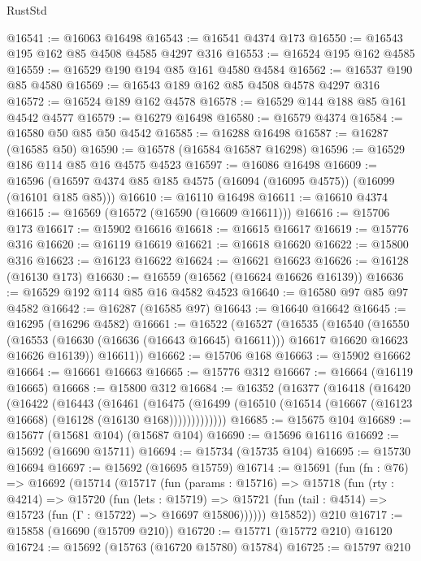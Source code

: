\begin{lexlean}{RustStd}
\begin{coremodule}
@16541 := @16063 @16498
@16543 := @16541 @4374 @173
@16550 := @16543 @195 @162 @85 @4508 @4585 @4297 @316
@16553 := @16524 @195 @162 @4585
@16559 := @16529 @190 @194 @85 @161 @4580 @4584
@16562 := @16537 @190 @85 @4580
@16569 := @16543 @189 @162 @85 @4508 @4578 @4297 @316
@16572 := @16524 @189 @162 @4578
@16578 := @16529 @144 @188 @85 @161 @4542 @4577
@16579 := @16279 @16498
@16580 := @16579 @4374
@16584 := @16580 @50 @85 @50 @4542
@16585 := @16288 @16498
@16587 := @16287 (@16585 @50)
@16590 := @16578 (@16584 @16587 @16298)
@16596 := @16529 @186 @114 @85 @16 @4575 @4523
@16597 := @16086 @16498
@16609 := @16596 (@16597 @4374 @85 @185 @4575 (@16094 (@16095 @4575)) (@16099 (@16101 @185 @85)))
@16610 := @16110 @16498
@16611 := @16610 @4374
@16615 := @16569 (@16572 (@16590 (@16609 @16611)))
@16616 := @15706 @173
@16617 := @15902 @16616
@16618 := @16615 @16617
@16619 := @15776 @316
@16620 := @16119 @16619
@16621 := @16618 @16620
@16622 := @15800 @316
@16623 := @16123 @16622
@16624 := @16621 @16623
@16626 := @16128 (@16130 @173)
@16630 := @16559 (@16562 (@16624 @16626 @16139))
@16636 := @16529 @192 @114 @85 @16 @4582 @4523
@16640 := @16580 @97 @85 @97 @4582
@16642 := @16287 (@16585 @97)
@16643 := @16640 @16642
@16645 := @16295 (@16296 @4582)
@16661 := @16522
    (@16527
      (@16535
        (@16540
          (@16550
            (@16553 (@16630 (@16636 (@16643 @16645) @16611)))
            @16617
            @16620
            @16623
            @16626
            @16139))
        @16611))
@16662 := @15706 @168
@16663 := @15902 @16662
@16664 := @16661 @16663
@16665 := @15776 @312
@16667 := @16664 (@16119 @16665)
@16668 := @15800 @312
@16684 := @16352
    (@16377
      (@16418
        (@16420
          (@16422
            (@16443
              (@16461
                (@16475
                  (@16499 (@16510 (@16514 (@16667 (@16123 @16668) (@16128 (@16130 @168)))))))))))))
@16685 := @15675 @104
@16689 := @15677 (@15681 @104) (@15687 @104)
@16690 := @15696 @16116
@16692 := @15692 (@16690 @15711)
@16694 := @15734 (@15735 @104)
@16695 := @15730 @16694
@16697 := @15692 (@16695 @15759)
@16714 := @15691
    (fun (fn : @76) =>
    @16692
      (@15714
        (@15717
          (fun (params : @15716) =>
          @15718
            (fun (rty : @4214) =>
            @15720
              (fun (lets : @15719) =>
              @15721 (fun (tail : @4514) => @15723 (fun (Γ : @15722) => @16697 @15806))))))
        @15852))
    @210
@16717 := @15858 (@16690 (@15709 @210))
@16720 := @15771 (@15772 @210) @16120
@16724 := @15692 (@15763 (@16720 @15780) @15784)
@16725 := @15797 @210

\end{coremodule}
\end{lexlean}
